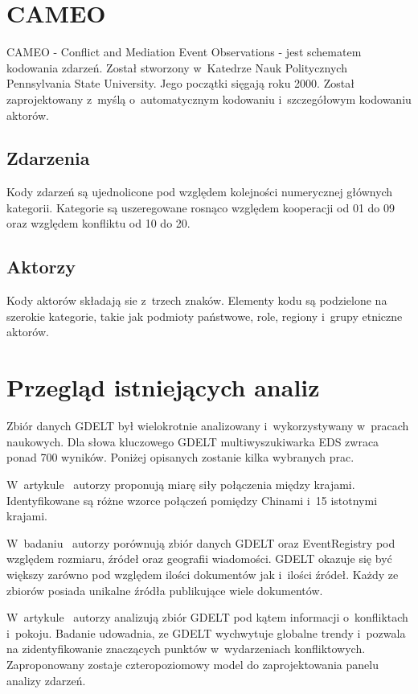 \documentclass[11pt]{report}
\begin{document}
    \section{CAMEO}\label{sec:cameo}
    CAMEO - Conflict and Mediation Event Observations - jest schematem kodowania zdarzeń.
    Został stworzony w~Katedrze Nauk Politycznych Pennsylvania State University.
    Jego początki sięgają roku 2000.
    Został zaprojektowany z~myślą o~automatycznym kodowaniu i~szczegółowym kodowaniu aktorów.

    \subsection{Zdarzenia}
    Kody zdarzeń są ujednolicone pod względem kolejności numerycznej głównych kategorii.
    Kategorie są uszeregowane rosnąco względem kooperacji od 01 do 09 oraz względem konfliktu od 10 do 20.

    \subsection{Aktorzy}
    Kody aktorów składają sie z~trzech znaków.
    Elementy kodu są podzielone na szerokie kategorie, takie jak podmioty państwowe, role, regiony i~grupy etniczne aktorów.


    \section{Przegląd istniejących analiz} \label{sec:przeglad}
    Zbiór danych GDELT był wielokrotnie analizowany i~wykorzystywany w~pracach naukowych.
    Dla słowa kluczowego GDELT multiwyszukiwarka EDS zwraca ponad 700 wyników.
    Poniżej opisanych zostanie kilka wybranych prac.

    W~artykule~\cite{Yuan2017} autorzy proponują miarę siły połączenia między krajami.
    Identyfikowane są różne wzorce połączeń pomiędzy Chinami i~15 istotnymi krajami.

    W~badaniu~\cite{Kwak2016} autorzy porównują zbiór danych GDELT oraz EventRegistry pod względem rozmiaru, źródeł oraz geografii wiadomości.
    GDELT okazuje się być większy zarówno pod względem ilości dokumentów jak i~ilości źródeł.
    Każdy ze zbiorów posiada unikalne źródła publikujące wiele dokumentów.

    W~artykule~\cite{Keertipati2014} autorzy analizują zbiór GDELT pod kątem informacji o~konfliktach i~pokoju.
    Badanie udowadnia, ze GDELT wychwytuje globalne trendy i~pozwala na zidentyfikowanie znaczących punktów w~wydarzeniach konfliktowych.
    Zaproponowany zostaje czteropoziomowy model do zaprojektowania panelu analizy zdarzeń.
\end{document}
